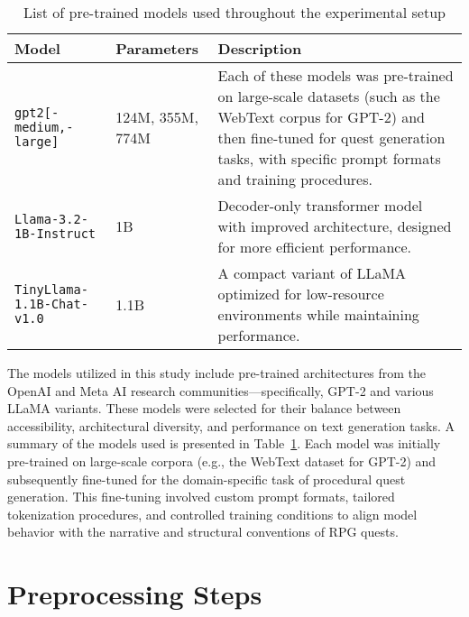\begin{table}[t]
  \centering
  \scriptsize
  \renewcommand{\arraystretch}{1.3}
  \begin{tabularx}{0.95\textwidth}{
    >{\raggedright\arraybackslash}p{4cm}
    >{\centering\arraybackslash}p{4cm}
    >{\raggedright\arraybackslash}X
  }
    \toprule
    \textbf{Model} & \textbf{Parameters} & \textbf{Description} \\
    \midrule
    \texttt{gpt2[-medium,-large]} & 124M, 355M, 774M & Each of these models was pre-trained on large-scale datasets (such as the WebText corpus for GPT-2) and then fine-tuned for quest generation tasks, with specific prompt formats and training procedures. \\
    \texttt{Llama-3.2-1B-Instruct} & 1B & Decoder-only transformer model with improved architecture, designed for more efficient performance. \\
    \texttt{TinyLlama-1.1B-Chat-v1.0} & 1.1B & A compact variant of LLaMA optimized for low-resource environments while maintaining performance. \\
    \bottomrule
  \end{tabularx}
  \caption{List of pre-trained models used throughout the experimental setup}
  \label{table:models-used}
\end{table}

The models utilized in this study include pre-trained architectures from the OpenAI and
Meta AI research communities—specifically, GPT-2 and various LLaMA variants. These
models were selected for their balance between accessibility, architectural diversity, and
performance on text generation tasks. A summary of the models used is presented in
Table~\ref{table:models-used}. Each model was initially pre-trained on large-scale corpora (e.g., the WebText
dataset for GPT-2) and subsequently fine-tuned for the domain-specific task of procedural
quest generation. This fine-tuning involved custom prompt formats, tailored tokenization
procedures, and controlled training conditions to align model behavior with the narrative
and structural conventions of RPG quests.

\section*{Preprocessing Steps}

